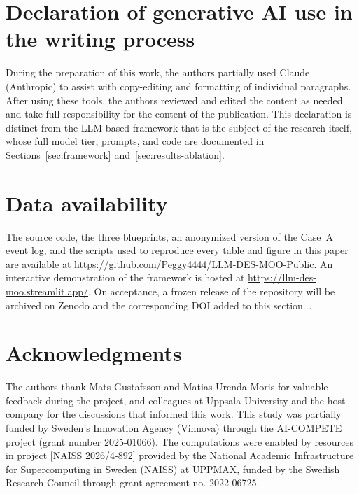 \documentclass[a4paper,fleqn]{cas-sc}
\begin{document}
  \section*{Declaration of generative AI use in the writing process}                                                    
  During the preparation of this work, the authors partially used Claude (Anthropic) to assist with copy-editing and formatting of individual paragraphs. After using these tools, the authors reviewed and edited the content as needed and take full responsibility for the content of the publication. This declaration is distinct from the LLM-based framework that is the subject of the research itself, whose full model tier, prompts, and code are documented in Sections~\ref{sec:framework} and~\ref{sec:results-ablation}.

  \section*{Data availability}\label{sec:data-availability}                                                             
The source code, the three blueprints, an anonymized version of the Case~A event log, and the scripts used to         
  reproduce every table and figure in this paper are available at \url{https://github.com/Peggy4444/LLM-DES-MOO-Public}.
   An interactive demonstration of the framework is hosted at \url{https://llm-des-moo.streamlit.app/}. On acceptance, a
   frozen release of the repository will be archived on Zenodo and the corresponding DOI added to this section.     .                          
                                                                                                                        
  \section*{Acknowledgments}                                                                                            
  The authors thank Mats Gustafsson and Matias Urenda Moris for valuable feedback during the project, and colleagues at Uppsala University and
  the host company for the discussions that informed this work.       
  This study was partially funded by Sweden’s Innovation Agency (Vinnova) through the AI-COMPETE project (grant number 2025-01066).
  The computations were enabled by resources in project [NAISS 2026/4-892] provided by the National Academic Infrastructure for Supercomputing in Sweden (NAISS) at UPPMAX, funded by the Swedish Research Council through grant agreement no. 2022-06725.
                                                            
\end{document}

